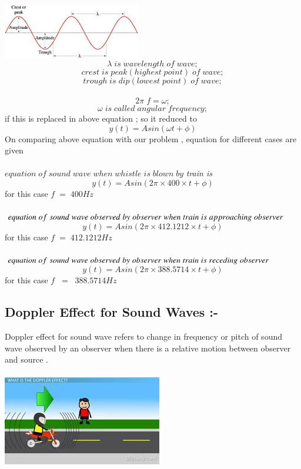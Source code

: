 \documentclass[journal,12pt,twocolumn]{IEEEtran}
\theoremstyle{remark}
\begin{document}
\includegraphics[width=0.45\textwidth]{waves.jpeg}\\
$$\lambda \;is\; wavelength\; of\; wave;$$$$crest \;is\; peak(highest\; point) \;of\; wave;$$$$trough\; is\; dip(lowest\; point) \;of\; wave;$$\\
$$2\pi \;f = \omega;$$
$$\omega \;is\; called \;angular\; frequency;$$
if this is replaced in above equation ; so it reduced to
$$y(t) = Asin(\omega t + \phi ) $$  
\newpage
On comparing above equation with our problem , equation for different cases are given\\\\
$equation \;of\; sound\; wave\; when\; whistle\; is\; blown\; by$
\textit{train is}
$$y(t) = Asin( 2 \pi \times400\times t + \phi ) $$ 
\;\;\;\;\;\;\;\;\;\;\;\;\;\;\;\;\;\;\;\;for this case $f\;=\;400Hz$\\\\
$equation \;of\; sound\; wave\; observed\; by\; observer\;when\\ \;train\;is\; approaching\; observer\;$
$$y(t) = Asin( 2 \pi \times412.1212\times t + \phi ) $$ 
\;\;\;\;\;\;\;\;\;\;\;\;\;\;\;\;\;\;\;\;for this case $f\;=\;412.1212Hz$\\\\
$equation \;of\; sound\; wave\; observed\; by\; observer\;when\\ \;train\;is\; receding\; observer\;$
$$y(t) = Asin( 2 \pi \times388.5714\times t + \phi ) $$ 
\;\;\;\;\;\;\;\;\;\;\;\;\;\;\;\;\;\;\;\;for this case $f \;\;= \;\;388.5714Hz$\\
\subsection*{\textbf{Doppler Effect for Sound Waves :-}}
Doppler effect for sound wave refers to change in frequency or pitch of sound wave observed by an observer when there is a relative motion between observer and source .\\\\

    \includegraphics[width=1\linewidth]{doppler.jpg}\\\\
\end{document}
